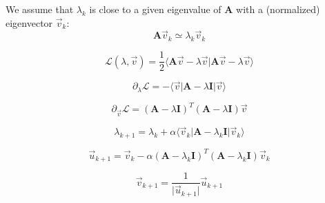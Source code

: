 \documentclass[aps,12pt]{revtex4}
\begin{document}
We assume that $\lambda_k$ is close to a given eigenvalue of $\bm{A}$ with a (normalized) eigenvector $\vec{v}_k$:
\begin{equation}
	\bm{A} \vec{v}_k \simeq \lambda_k \vec{v}_k
\end{equation}

\begin{equation}
	\mathcal{L}(\lambda,\vec{v}) = 
	\dfrac{1}{2} 
	\langle \bm{A}\vec{v} - \lambda \vec{v} \vert \bm{A}\vec{v} - \lambda \vec{v}\rangle
\end{equation}

\begin{equation}
	\partial_\lambda \mathcal{L} = - \langle \vec{v} \vert \bm{A}  - \lambda \bm{I} \vert \vec{v} \rangle
\end{equation}

\begin{equation}
	\partial_{\vec{v}} \mathcal{L} =  (\bm{A}  - \lambda \bm{I})^T  (\bm{A}  - \lambda \bm{I}) \vec{v}
\end{equation}

\begin{equation}
	\lambda_{k+1} = \lambda_k + \alpha \langle \vec{v}_k \vert \bm{A}  - \lambda_k \bm{I} \vert \vec{v}_k \rangle
\end{equation}

\begin{equation}
	\vec{u}_{k+1} = \vec{v}_k - \alpha (\bm{A}  - \lambda_k \bm{I})^T(\bm{A}  - \lambda_k \bm{I}) \vec{v}_k
\end{equation}

\begin{equation}
	\vec{v}_{k+1} = \dfrac{1}{\vert \vec{u}_{k+1} \vert} \vec{u}_{k+1}
\end{equation}
\end{document}
